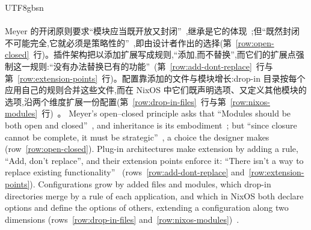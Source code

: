 \begin{CJK*}{UTF8}{gbsn}
\paragraph{}
\ifPaperChinese
Meyer 的开闭原则要求``模块应当既开放又封闭''~\cite[第~57~页]{meyer1997-object-oriented-software-construction},继承是它的体现~\cite[第~497、608~页]{meyer1997-object-oriented-software-construction};但``既然封闭不可能完全,它就必须是策略性的''~\cite{martin1996-open-closed-principle},即由设计者作出的选择(第~\ref{row:open-closed}~行)。插件架构把以添加扩展写成规则,``添加,而不替换'',而它们的扩展点强制这一规则:``没有办法替换已有的功能''~\cite[第~24、67~页]{gamma2004-contributing-to-eclipse}(第~\ref{row:add-dont-replace}~行与第~\ref{row:extension-points}~行)。配置靠添加的文件与模块增长:drop-in 目录按每个应用自己的规则合并这些文件,而在 NixOS 中它们既声明选项、又定义其他模块的选项,沿两个维度扩展一份配置(第~\ref{row:drop-in-files}~行与第~\ref{row:nixos-modules}~行)~\cite{systemd-contributors-sysctl-d, systemd-contributors-tmpfiles-d, sudo-contributors-sudoers, nixos-contributors-nixos-modules}。
\else
Meyer's open--closed principle asks that ``Modules should be both open and
closed''~\cite[p.~57]{meyer1997-object-oriented-software-construction}, and inheritance is its
embodiment~\cite[pp.~497, 608]{meyer1997-object-oriented-software-construction}; but ``since closure
cannot be complete, it must be strategic''~\cite{martin1996-open-closed-principle}, a choice the
designer makes (row~\ref{row:open-closed}).
Plug-in architectures make extension by adding a rule, ``Add, don't replace'', and their extension points
enforce it: ``There isn't a way to replace existing
functionality''~\cite[pp.~24, 67]{gamma2004-contributing-to-eclipse}
(rows~\ref{row:add-dont-replace} and~\ref{row:extension-points}).
Configurations grow by added files and modules, which drop-in directories merge by a rule of each
application, and which in NixOS both declare options and define the options of others, extending a
configuration along two dimensions
(rows~\ref{row:drop-in-files} and~\ref{row:nixos-modules})~\cite{systemd-contributors-sysctl-d, systemd-contributors-tmpfiles-d, sudo-contributors-sudoers, nixos-contributors-nixos-modules}.
\fi


\end{CJK*}
